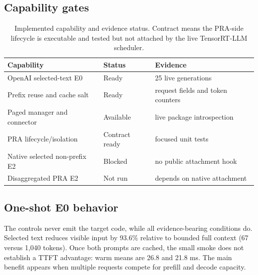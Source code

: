 \documentclass[10pt]{article}
\begin{document}
\subsection{Capability gates}
\begin{table}[ht]
\centering
\caption{Implemented capability and evidence status. Contract means the
PRA-side lifecycle is executable and tested but not attached by the live
TensorRT-LLM scheduler.}
\begin{tabular}{lll}
\toprule
Capability & Status & Evidence \\
\midrule
OpenAI selected-text E0 & Ready & 25 live generations \\
Prefix reuse and cache salt & Ready & request fields and token counters \\
Paged manager and connector & Available & live package introspection \\
PRA lifecycle/isolation & Contract ready & focused unit tests \\
Native selected non-prefix E2 & Blocked & no public attachment hook \\
Disaggregated PRA E2 & Not run & depends on native attachment \\
\bottomrule
\end{tabular}
\end{table}

\subsection{One-shot E0 behavior}
\begin{table}[ht]
\centering
\caption{Controlled E0 serving smoke. Visible is mean prompt tokens; times are
milliseconds. Cold is the first request and warm is the mean of repetitions
2--5.}

\end{table}

The controls never emit the target code, while all evidence-bearing conditions
do. Selected text reduces visible input by 93.6\% relative to bounded full
context (67 versus 1,040 tokens). Once both prompts are cached, the small smoke
does not establish a TTFT advantage: warm means are 26.8 and 21.8 ms. The main
benefit appears when multiple requests compete for prefill and decode capacity.
\end{document}
